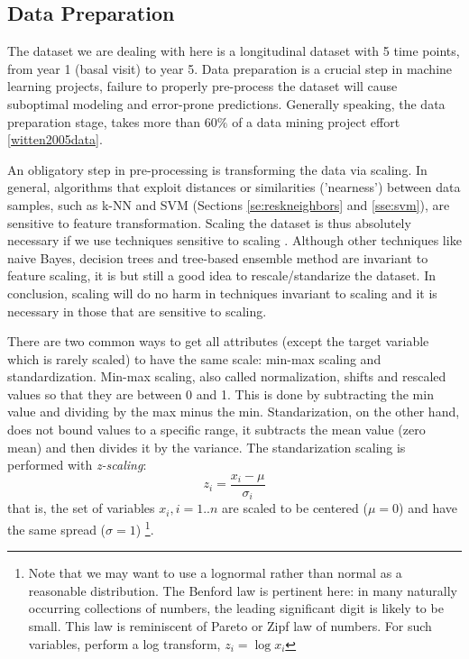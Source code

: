 \documentclass[11pt]{article}
\theoremstyle{definition}
\theoremstyle{remark}
\begin{document}
\subsection{Data Preparation} 
\label{sse:dp}
  
The dataset we are dealing with here is a longitudinal dataset with 5 time points, from year 1 (basal visit) to year 5.
Data preparation is a crucial step in machine learning projects, failure to properly pre-process the dataset will cause suboptimal modeling and error-prone predictions.
Generally speaking, the data preparation stage, takes more than $60\%$ of a data mining project effort \ref{witten2005data}.

An obligatory step in pre-processing is transforming the data via scaling. 
In general, algorithms that exploit distances or similarities ('nearness') between data samples, such as k-NN and SVM (Sections \ref{se:reskneighbors} and \ref{sse:svm}), are sensitive to feature transformation. 
Scaling the dataset is thus absolutely necessary if we use techniques sensitive to scaling \cite{wu2012foundations}. Although other techniques like naive Bayes, decision trees and tree-based ensemble method are invariant to feature scaling, it is but still a good idea to rescale/standarize the dataset. In conclusion, scaling will do no harm in techniques invariant to scaling and it is necessary in those that are sensitive to scaling. 

There are two common ways to get all attributes (except the target variable which is rarely scaled) to have the same scale: min-max scaling and standardization.
Min-max scaling, also called normalization, shifts and rescaled values so that they are between 0 and 1. This is done by subtracting the min value and dividing by the max minus the min. 
Standarization, on the other hand, does not bound values to a specific range, it subtracts the mean value (zero mean) and then divides it by the variance. 
The standarization scaling is performed with \emph{z-scaling}:
\begin{equation} \label{eq:scaling}
z_i = \frac{x_i -\mu}{\sigma_i}
\end{equation}
that is, the set of variables $x_i, i=1..n$ are scaled to be centered ($\mu=0$) and have the same spread ($\sigma=1$) \footnote{Note that we may want to use a lognormal rather than normal as a reasonable distribution. The Benford law is pertinent here: in many naturally occurring collections of numbers, the leading significant digit is likely to be small. This law is reminiscent of Pareto or Zipf law of numbers. For such variables, perform a log transform, $z_i = \log x_i$}. 
\end{document}
